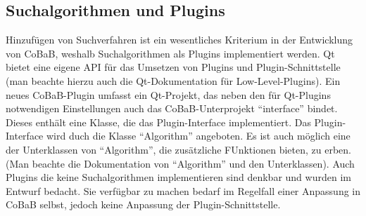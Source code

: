 \subsection{Suchalgorithmen und Plugins}
Hinzufügen von Suchverfahren ist ein wesentliches Kriterium in der Entwicklung von CoBaB, weshalb Suchalgorithmen als Plugins implementiert werden. Qt bietet eine eigene API für das Umsetzen von Plugins und Plugin-Schnittstelle (man beachte hierzu auch die Qt-Dokumentation für Low-Level-Plugins). Ein neues CoBaB-Plugin umfasst ein Qt-Projekt, das neben den für Qt-Plugins notwendigen Einstellungen auch das CoBaB-Unterprojekt \enquote{interface} bindet. Dieses enthält eine Klasse, die das Plugin-Interface implementiert. Das Plugin-Interface wird duch die Klasse \enquote{Algorithm} angeboten. Es ist auch möglich eine der Unterklassen von \enquote{Algorithm}, die zusätzliche FUnktionen bieten, zu erben. (Man beachte die Dokumentation von \enquote{Algorithm} und den Unterklassen).
Auch Plugins die keine Suchalgorithmen implementieren sind denkbar und wurden im Entwurf bedacht. Sie verfügbar zu machen bedarf im Regelfall einer Anpassung in CoBaB selbst, jedoch keine Anpassung der Plugin-Schnittstelle.
